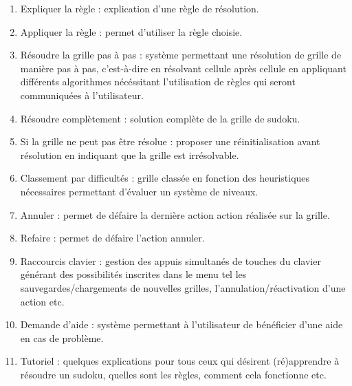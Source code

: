 \begin{enumerate}
  \item Expliquer la règle : explication d'une règle de résolution. \\
  
  \item Appliquer la règle : permet d'utiliser la règle choisie. \\
  
  \item Résoudre la grille pas à pas : système permettant une résolution 
  de grille de manière pas à pas, c'est-à-dire en résolvant cellule après cellule en appliquant 
  différents algorithmes nécéssitant l'utilisation de règles qui seront communiquées à l'utilisateur. \\
  
  \item Résoudre complètement : solution complète de la grille de sudoku. \\
  
  \item Si la grille ne peut pas être résolue : proposer une réinitialisation 
  avant résolution en indiquant que la grille est irrésolvable. \\
  
  \item Classement par difficultés : grille classée en fonction 
  des heuristiques nécessaires permettant d'évaluer un système de niveaux. \\
  
  \item Annuler : permet de défaire la dernière action action réalisée sur la grille.\\
  
  \item Refaire : permet de défaire l'action annuler. \\

  \item Raccourcis clavier : gestion des appuis simultanés de touches du clavier 
  générant des possibilités inscrites dans le menu tel les sauvegardes/chargements 
  de nouvelles grilles, l'annulation/réactivation d'une action etc.  \\  
  
  \item Demande d’aide : système permettant à l'utilisateur 
  de bénéficier d'une aide en cas de problème. \\

  \item Tutoriel : quelques explications pour tous ceux qui désirent (ré)apprendre 
  à résoudre un sudoku, quelles sont les règles, comment cela fonctionne etc.\\ 
  

\end{enumerate}
